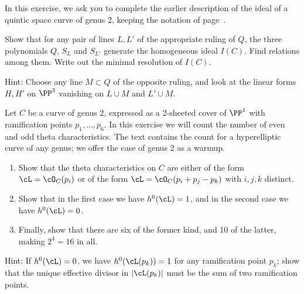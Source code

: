 \begin{exercise}
\label{ideal of genus 2 degree 5}
In 
this
exercise, we ask you to complete the
earlier
description
of the ideal of a quintic space curve of
genus 2,
keeping the notation of page~\pageref{genus 2 quintic}.

Show that for any pair of lines $L, L'$ of the appropriate ruling of $Q$,
%
the three polynomials $Q$, $S_L$ and $S_{L'}$ generate the homogeneous
ideal $I(C)$. Find relations among them. Write out the minimal resolution
of $I(C)$.

Hint: Choose any line $M \subset Q$ of the opposite ruling, and look
at the linear forms $H, H'$ on $\PP^3$ vanishing on $L \cup M$ and $L'
\cup M$.
\end{exercise}

\begin{exercise}
\label{theta char on genus 2}
 Let $C$ be a curve of genus 2, expressed as a 2-sheeted cover of $\PP^1$
 with ramification points $p_1,\dots,p_6$. In this exercise we will
 count the number of
 even and odd theta characteristics.
The text contains the count for a hyperelliptic curve of any genus;
we offer
the case of genus 2 as a warmup.
 \begin{enumerate}
 \item Show that the theta characteristics on $C$ are either of the
 form $\cL = \cO_C(p_i)$ or of the form $\cL = \cO_C(p_i + p_j - p_k)$
 with $i, j, k$ distinct.
 \item Show that in the first case we have $h^0(\cL) = 1$, and in the
 second case we have $h^0(\cL) = 0$.
 \item Finally, show that there are six of the former kind, and 10 of
 the latter, making $2^4 = 16$ in all.
 \end{enumerate}

 Hint: If $h^0(\cL) = 0$, 
we have $h^0(\cL(p_k)) = 1$ for any ramification point $p_k$;
show that  the unique effective divisor in
 $|\cL(p_k)|$ must be the sum of two ramification points.
 \end{exercise}

